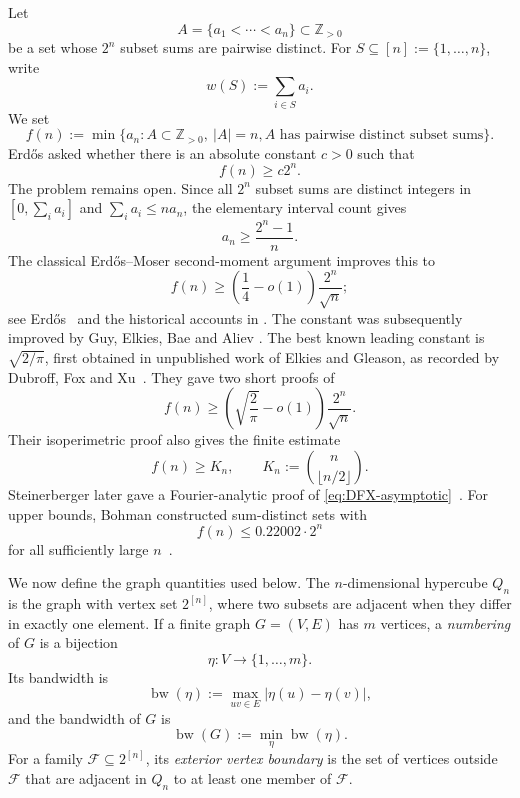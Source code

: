 \documentclass[10pt]{amsart}
\numberwithin{equation}{section}
\newcommand{\bw}{\operatorname{bw}}
\begin{document}
Let
\[
 A=\{a_1<\cdots<a_n\}\subset \mathbb Z_{>0}
\]
be a set whose $2^n$ subset sums are pairwise distinct.  For
$S\subseteq[n]:=\{1,\ldots,n\}$, write
\[
 w(S):=\sum_{i\in S}a_i.
\]
We set
\[
 f(n):=\min\{a_n: A\subset\mathbb Z_{>0},\ |A|=n,
              \text{$A$ has pairwise distinct subset sums}\}.
\]
Erd\H{o}s asked whether there is an absolute constant $c>0$ such that
\[
 f(n)\ge c2^n.
\]
The problem remains open.  Since all $2^n$ subset sums are distinct integers in
$[0,\sum_i a_i]$ and $\sum_i a_i\le n a_n$, the elementary interval count gives
\[
 a_n\ge \frac{2^n-1}{n}.
\]
The classical Erd\H{o}s--Moser second-moment argument
improves this to
\[
 f(n)\ge \left(\frac14-o(1)\right)\frac{2^n}{\sqrt n};
\]
see Erd\H{o}s~\cite{Erdos1956} and the historical accounts in
\cite{Guy1982,DFX,Steinerberger2023}.  The constant was subsequently improved
by Guy, Elkies, Bae and Aliev
\cite{Guy1982,Elkies1986,Bae1996,Aliev2008}.  The best known leading constant
is $\sqrt{2/\pi}$, first obtained in unpublished work of Elkies and Gleason,
as recorded by Dubroff, Fox and Xu~\cite{DFX}.  They gave two short proofs of
\begin{equation}\label{eq:DFX-asymptotic}
 f(n)\ge
 \left(\sqrt{\frac2\pi}-o(1)\right)\frac{2^n}{\sqrt n}.
\end{equation}
Their isoperimetric proof also gives the finite estimate
\begin{equation}\label{eq:DFX-finite}
 f(n)\ge K_n,
 \qquad
 K_n:=\binom{n}{\lfloor n/2\rfloor}.
\end{equation}
Steinerberger later gave a Fourier-analytic proof of
\cref{eq:DFX-asymptotic}~\cite{Steinerberger2023}.  For upper bounds, Bohman
constructed sum-distinct sets with
\[
 f(n)\le 0.22002 \cdot 2^n
\]
for all sufficiently large $n$~\cite{Bohman1998}.

We now define the graph quantities used below.  The $n$-dimensional hypercube
$Q_n$ is the graph with vertex set $2^{[n]}$, where two subsets are adjacent
when they differ in exactly one element.  If a finite graph $G=(V,E)$ has
$m$ vertices, a \emph{numbering} of $G$ is a bijection
\[
 \eta:V\longrightarrow\{1,\ldots,m\}.
\]
Its bandwidth is
\[
 \bw(\eta):=\max_{uv\in E}|\eta(u)-\eta(v)|,
\]
and the bandwidth of $G$ is
\[
 \bw(G):=\min_{\eta}\bw(\eta).
\]
For a family $\mathcal F\subseteq2^{[n]}$, its \emph{exterior vertex boundary}
is the set of vertices outside $\mathcal F$ that are adjacent in $Q_n$ to at
least one member of $\mathcal F$.
\end{document}
